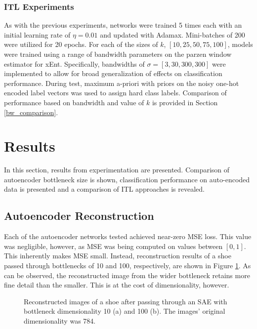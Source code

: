 \documentclass[conference]{IEEEtran}
\begin{document}
	 \subsubsection*{ITL Experiments}
	 As with the previous experiments, networks were trained 5 times each with an initial learning rate of $\eta=0.01$ and updated with Adamax.  Mini-batches of 200 were utilized for 20 epochs.  For each of the sizes of $k$, $[10,25,50,75,100]$, models were trained using a range of bandwidth parameters on the parzen window estimator for xEnt.  Specifically, bandwidths of $\sigma = [3,30,300,300]$ were implemented to allow for broad generalization of effects on classification performance. During test, maximum a-priori with priors on the noisy one-hot encoded label vectors was used to assign hard class labels. Comparison of performance based on bandwidth and value of $k$ is provided in Section \ref{bw_comparison}.
	 


\section{Results} \label{Results}
In this section, results from experimentation are presented.  Comparison of autoencoder bottleneck size is shown, classification performance on auto-encoded data is presented and a comparison of ITL approaches is revealed. 

\subsection{Autoencoder Reconstruction} \label{ae_reconstruction}
Each of the autoencoder  networks tested achieved near-zero MSE loss. This value was negligible, however, as MSE was being computed on values between $[0,1]$.  This inherently makes MSE small.  Instead, reconstruction results of a shoe passed through bottlenecks of 10 and 100, respectively, are shown in Figure \ref{fig:ae_reconstruction}.  As can be observed, the reconstructed image from the wider bottleneck retains more fine detail than the smaller.  This is at the cost of dimensionality, however.

\begin{figure}%
	\centering
	\caption{Reconstructed images of a shoe after passing through an SAE with bottleneck dimensionality 10 (a) and 100 (b).  The images' original dimensionality was 784.}%
	\label{fig:ae_reconstruction}%
\end{figure}
\end{document}
